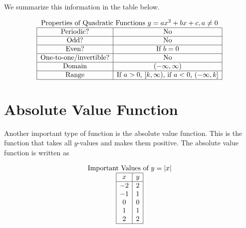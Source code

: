 \documentclass[nooutcomes]{ximera}
\begin{document}
We summarize this information in the table below.

\[
\begin{array}{  c  }
\text{\normalfont Properties of Quadratic Functions } y=ax^2 + bx + c, a \ne 0 \\
 \begin{array}{|c|c|}
 \hline
\text{Periodic?} & \text{No} \\ \hline
\text{Odd?} & \text{No} \\ \hline
\text{Even?} & \text{If } b = 0 \\ \hline
\text{One-to-one/invertible?} & \text{No}\\ \hline
\text{Domain} & (-\infty,\infty)\\ \hline
\text{Range} & \text{If }a > 0\text{, } [k,\infty) \text{, if }a < 0\text{, } (-\infty, k]\\ \hline
\end{array}
\end{array}
\]



\newpage


\section{Absolute Value Function}
Another important type of function is the absolute value function.  This is the function that takes all $y$-values and makes them positive.  The absolute value function is written as 

\begin{center}
\end{center}

\begin{center}
\end{center}

\[
\begin{array}{c }
\text{\normalfont Important Values of $y=|x|$} \\
\begin{array}{|c|c|}
 \hline
 x & y\\
 \hline
 -2&2\\ 
-1&1\\ 
0&0\\
 1&1\\
 2&2\\
 \hline
\end{array}
\end{array}
\]
\end{document}
